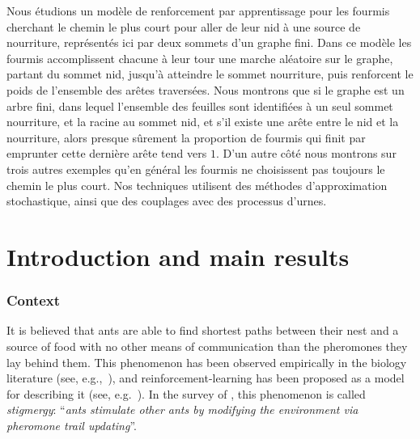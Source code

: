 \documentclass[JEP,XML,SOM,Unicode,NoFloatCountersInSection,published]{cedram}
\numberwithin{equation}{section}
\theoremstyle{definition}
\begin{document}


\begin{altabstract}
Nous étudions un modèle de renforcement par apprentissage pour les fourmis cherchant le chemin le plus court pour aller de leur nid à une source de nourriture, représentés ici par deux sommets d’un graphe fini. Dans ce modèle les fourmis accomplissent chacune à leur tour une marche aléatoire sur le graphe, partant du sommet nid, jusqu’à atteindre le sommet nourriture, puis renforcent le poids de l’ensemble des arêtes traversées. Nous montrons que si le graphe est un arbre fini, dans lequel l’ensemble des feuilles sont identifiées à un seul sommet nourriture, et la racine au sommet nid, et s’il existe une arête entre le nid et la nourriture, alors presque sûrement la proportion de fourmis qui finit par emprunter cette dernière arête tend vers $1$. D’un autre côté nous montrons sur trois autres exemples qu’en général les fourmis ne choisissent pas toujours le chemin le plus court. Nos techniques utilisent des méthodes d’approximation stochastique, ainsi que des couplages avec des processus d'urnes.
\end{altabstract}
\maketitle

\vspace*{-\baselineskip}
\tableofcontents
\mainmatter

\section{Introduction and main results}
\subsubsection*{Context}
It is believed that ants are able to find shortest paths between their nest and a source of food
with no other means of communication than the pheromones they lay behind them.
This phenomenon has been observed empirically in the biology literature
(see, e.g.,~\cite{ants_89, Deneu90, current_ants}), and reinforcement-learning has been proposed as a model for {describing it} (see, e.g.~\cite{current_ants}).
In the survey of \cite[Ch.\,1]{book_ant}, this phenomenon is called \emph{stigmergy}: ``\emph{ants stimulate other ants by modifying the environment via pheromone trail updating}''.
\end{document}
